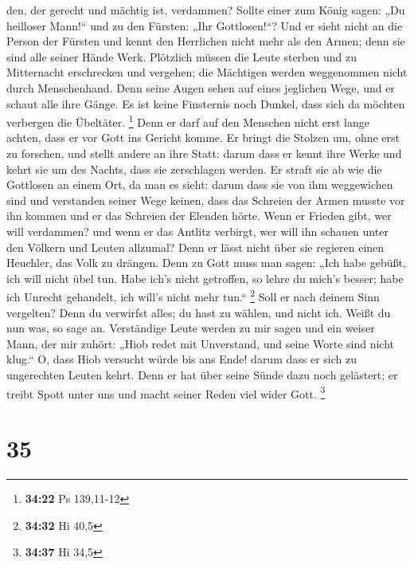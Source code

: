 den, der gerecht und mächtig ist, verdammen?  Sollte
einer zum König sagen: „Du heilloser Mann!{}`` und zu den Fürsten: „Ihr
Gottlosen!{}``?  Und er sieht nicht an die Person der
Fürsten und kennt den Herrlichen nicht mehr als den Armen; denn sie sind
alle seiner Hände Werk.  Plötzlich müssen die Leute
sterben und zu Mitternacht erschrecken und vergehen; die Mächtigen
werden weggenommen nicht durch Menschenhand.  Denn seine
Augen sehen auf eines jeglichen Wege, und er schaut alle ihre Gänge.
 Es ist keine Finsternis noch Dunkel, dass sich da
möchten verbergen die Übeltäter. \footnote{\textbf{34:22} Ps 139,11-12}
 Denn er darf auf den Menschen nicht erst lange achten,
dass er vor Gott ins Gericht komme.  Er bringt die
Stolzen um, ohne erst zu forschen, und stellt andere an ihre Statt:
 darum dass er kennt ihre Werke und kehrt sie um des
Nachts, dass sie zerschlagen werden.  Er straft sie ab
wie die Gottlosen an einem Ort, da man es sieht:  darum
dass sie von ihm weggewichen sind und verstanden seiner Wege keinen,
 dass das Schreien der Armen musste vor ihn kommen und er
das Schreien der Elenden hörte.  Wenn er Frieden gibt,
wer will verdammen? und wenn er das Antlitz verbirgt, wer will ihn
schauen unter den Völkern und Leuten allzumal?  Denn er
lässt nicht über sie regieren einen Heuchler, das Volk zu drängen.
 Denn zu Gott muss man sagen: „Ich habe gebüßt, ich will
nicht übel tun.  Habe ich's nicht getroffen, so lehre du
mich's besser; habe ich Unrecht gehandelt, ich will's nicht mehr tun.``
\footnote{\textbf{34:32} Hi 40,5}  Soll er nach deinem
Sinn vergelten? Denn du verwirfst alles; du hast zu wählen, und nicht
ich. Weißt du nun was, so sage an.  Verständige Leute
werden zu mir sagen und ein weiser Mann, der mir zuhört: 
„Hiob redet mit Unverstand, und seine Worte sind nicht klug.``
 O, dass Hiob versucht würde bis ans Ende! darum dass er
sich zu ungerechten Leuten kehrt.  Denn er hat über seine
Sünde dazu noch gelästert; er treibt Spott unter uns und macht seiner
Reden viel wider Gott. \footnote{\textbf{34:37} Hi 34,5}

\hypertarget{section-8}{%
\section{35}\label{section-8}}

